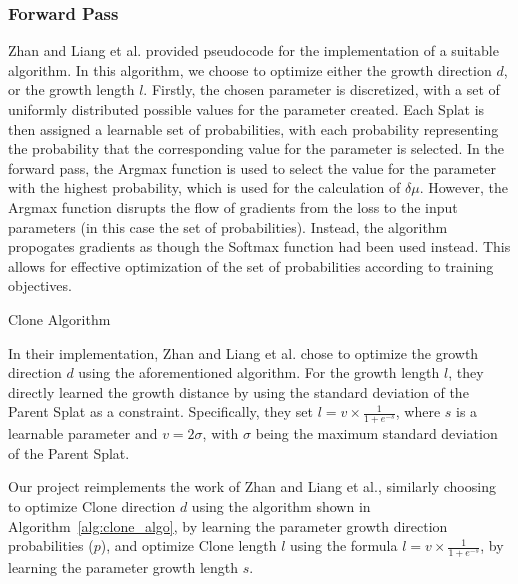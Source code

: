 \documentclass[11pt]{report}
\begin{document}
\subsubsection{Forward Pass}
Zhan and Liang et al. provided pseudocode for the implementation of a suitable algorithm. In this algorithm, we choose to optimize either the growth direction $d$, or the growth length $l$. Firstly, the chosen parameter is discretized, with a set of uniformly distributed possible values for the parameter created. Each Splat is then assigned a learnable set of probabilities, with each probability representing the probability that the corresponding value for the parameter is selected. In the forward pass, the Argmax function is used to select the value for the parameter with the highest probability, which is used for the calculation of $\delta \mu$. However, the Argmax function disrupts the flow of gradients from the loss to the input parameters (in this case the set of probabilities). Instead, the algorithm propogates gradients as though the Softmax function had been used instead. This allows for effective optimization of the set of probabilities according to training objectives.

\begin{center} %
    \begin{minipage}{0.70\textwidth}
        \begin{algorithm}[H]
        
        \caption{Clone Algorithm}
        \label{alg:clone_algo}
        \end{algorithm}
    \end{minipage}
\end{center}

In their implementation, Zhan and Liang et al. chose to optimize the growth direction $d$ using the aforementioned algorithm. For the growth length $l$, they directly learned the growth distance by using the standard deviation of the Parent Splat as a constraint. Specifically, they set $l = v \times \frac{1}{1 + e^{-s}}$, where $s$ is a learnable parameter and $v = 2 \sigma$, with $\sigma$ being the maximum standard deviation of the Parent Splat.

Our project reimplements the work of Zhan and Liang et al., similarly choosing to optimize Clone direction $d$ using the algorithm shown in Algorithm~\ref{alg:clone_algo}, by learning the parameter growth direction probabilities ($p$), and optimize Clone length $l$ using the formula $l = v \times \frac{1}{1 + e^{-s}}$, by learning the parameter growth length $s$.
\end{document}
